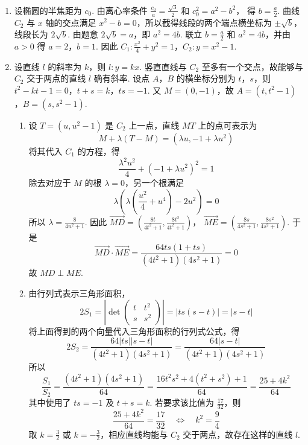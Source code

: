 \begin{solution}
\begin{enumerate}
\item 设椭圆的半焦距为 \(c_0\). 由离心率条件 \(\frac{c_0}{a}=\frac{\sqrt{3}}{2}\) 和 \(c_0^2=a^2-b^2\)，
得 \(b=\frac{a}{2}\). 曲线 \(C_2\) 与 \(x\) 轴的交点满足 \(x^2-b=0\)，所以截得线段的两个端点横坐标为 \(\pm\sqrt b\)，线段长为 \(2\sqrt b\). 由题意 \(2\sqrt b=a\)，即 \(a^2=4b\). 联立 \(b=\frac{a}{2}\) 和 \(a^2=4b\)，并由 \(a>0\) 得 \(a=2\)，\(b=1\). 因此 \(C_1:\frac{x^2}{4}+y^2=1\)，\(C_2:y=x^2-1\).

\item 设直线 \(l\) 的斜率为 \(k\)，则 \(l:y=kx\). 竖直直线与 \(C_2\) 至多有一个交点，故能够与 \(C_2\) 交于两点的直线 \(l\) 确有斜率. 设点 \(A\)，\(B\) 的横坐标分别为 \(t\)，\(s\)，则
\(t^2-kt-1=0\)，\(t+s=k\)，\(ts=-1\).
又 \(M=(0,-1)\)，故
\(A=(t,t^2-1)\)，\(B=(s,s^2-1)\).

\begin{enumerate}
\item 设 \(T=(u,u^2-1)\) 是 \(C_2\) 上一点，直线 \(MT\) 上的点可表示为
\[
M+\lambda(T-M)=\left(\lambda u,-1+\lambda u^2\right)
\]
将其代入 \(C_1\) 的方程，得
\[
\frac{\lambda^2u^2}{4}+\left(-1+\lambda u^2\right)^2=1
\]
除去对应于 \(M\) 的根 \(\lambda=0\)，另一个根满足
\[
\lambda\left(\lambda\left(\frac{u^2}{4}+u^4\right)-2u^2\right)=0
\]
所以 \(\lambda=\frac{8}{4u^2+1}\). 因此
\(\overrightarrow{MD}=\left(\frac{8t}{4t^2+1},\frac{8t^2}{4t^2+1}\right)\)，
\(\overrightarrow{ME}=\left(\frac{8s}{4s^2+1},\frac{8s^2}{4s^2+1}\right)\).
于是
\[
\overrightarrow{MD}\cdot\overrightarrow{ME}
=\frac{64ts(1+ts)}{(4t^2+1)(4s^2+1)}=0
\]
故 \(MD\perp ME\).

\item 由行列式表示三角形面积，
\[
2S_1=\left|\det\begin{pmatrix}t&t^2\\s&s^2\end{pmatrix}\right|=|ts(s-t)|=|s-t|
\]
将上面得到的两个向量代入三角形面积的行列式公式，得
\[
2S_2=\frac{64|ts||s-t|}{(4t^2+1)(4s^2+1)}=\frac{64|s-t|}{(4t^2+1)(4s^2+1)}
\]
所以
\[
\frac{S_1}{S_2}=\frac{(4t^2+1)(4s^2+1)}{64}
=\frac{16t^2s^2+4(t^2+s^2)+1}{64}
=\frac{25+4k^2}{64}
\]
其中使用了 \(ts=-1\) 及 \(t+s=k\). 若要求该比值为 \(\frac{17}{32}\)，则
\[
\frac{25+4k^2}{64}=\frac{17}{32}\quad\Longleftrightarrow\quad k^2=\frac{9}{4}
\]
取 \(k=\frac{3}{2}\) 或 \(k=-\frac{3}{2}\)，相应直线均能与 \(C_2\) 交于两点，故存在这样的直线 \(l\).
\end{enumerate}
\end{enumerate}
\end{solution}

